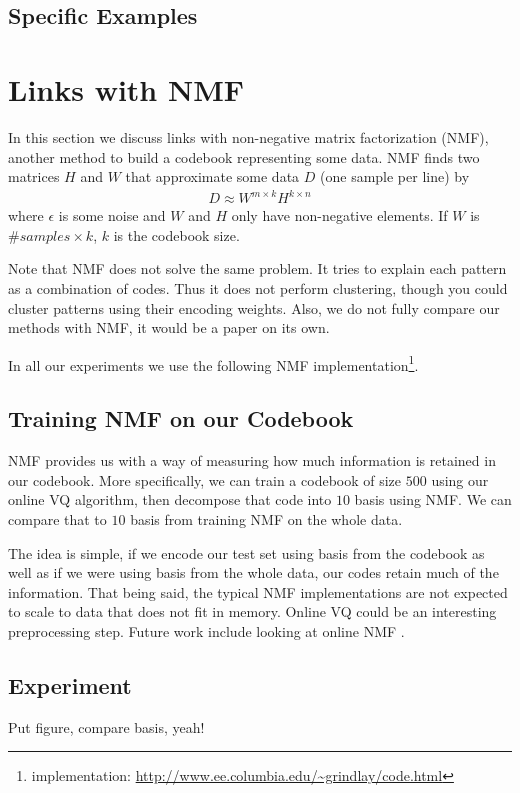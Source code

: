 \documentclass{article}
\begin{document}
\subsection{Specific Examples}


\section{Links with NMF}\label{sec:nmf}
In this section we discuss links with non-negative matrix factorization
\cite{Lee2000} (NMF), another method to build a codebook representing some data.
NMF finds two matrices $H$ and $W$ that approximate some data $D$ (one
sample per line) by
\begin{eqnarray}
D \approx W^{m \times k} H^{k \times n}
\end{eqnarray}
where $\epsilon$ is some noise and $W$ and $H$ only have non-negative 
elements. If $W$ is $\#samples \times k$, $k$ is the codebook size.

Note that NMF does not solve the same problem. It tries to explain each pattern
as a combination of codes. Thus it does not perform clustering, though you
could cluster patterns using their encoding weights. Also, we do not fully
compare our methods with NMF, it would be a paper on its own.

In all our experiments we use the following NMF
implementation\footnote{implementation: \url{http://www.ee.columbia.edu/~grindlay/code.html}}.

\subsection{Training NMF on our Codebook}
NMF provides us with a way of measuring how much information is retained
in our codebook. More specifically, we can train a codebook of size $500$
using our online VQ algorithm, then decompose that code into $10$ basis
using NMF. We can compare that to $10$ basis from training NMF on the
whole data.

The idea is simple, if we encode our test set using basis from the
codebook as well as if we were using basis from the whole data, our codes
retain much of the information. That being said, the typical NMF implementations
are not expected to scale to data that does not fit in memory. Online VQ
could be an interesting preprocessing step. Future work include looking
at online NMF \cite{Thurau2009}.

\subsection{Experiment}
Put figure, compare basis, yeah!
\end{document}
